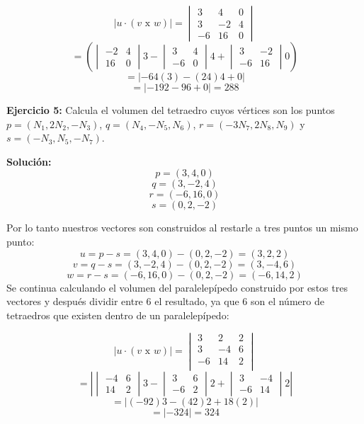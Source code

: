 \documentclass{article}
\begin{document}
$$\left| u \cdot(v\text{ x }w)\right| = \begin{vmatrix}
    3 & 4 & 0 \\
    3 & -2 & 4 \\
    -6 & 16 & 0
\end{vmatrix}$$
$$ = \left(\begin{vmatrix}
    -2 & 4 \\
    16 & 0 
\end{vmatrix}3-\begin{vmatrix}
    3 & 4 \\
    -6 & 0
\end{vmatrix}4+ \begin{vmatrix}
    3 & -2 \\
    -6 & 16
\end{vmatrix}0\right)$$
$$=\left|-64(3)-(24)4+0\right|$$
$$=\left|-192-96+0\right| = 288$$

\textbf{Ejercicio 5:} Calcula el volumen del tetraedro cuyos vértices son los puntos $p = (N_1, 2N_2 , -N_3)$, $q =(N_4,-N_5,N_6)$, 
$r = (-3N_7, 2N_8,N_9)$ y $s =(-N_3, N_5,-N_7)$. 
\vspace{10pt}

\textbf{Solución:}
$$p =(3, 4, 0)$$
$$q =(3,-2,4)$$
$$r = (-6, 16,0)$$
$$s =(0, 2,-2)$$ 

Por lo tanto nuestros vectores son construidos al restarle a tres puntos un mismo punto:
$$u = p -s = (3, 4, 0) - (0, 2,-2) = (3, 2, 2)$$
$$v = q - s= (3,-2,4)-(0, 2,-2) = (3, -4, 6)$$
$$w = r - s = (-6, 16, 0) - (0, 2,-2)= (-6, 14, 2)$$
Se continua calculando el volumen del paralelepípedo construido por estos tres vectores y después dividir entre 6 el resultado, ya que 6 son 
el número de tetraedros que existen dentro de un paralelepípedo:

$$\left| u \cdot(v\text{ x }w)\right| = \begin{vmatrix}
    3 & 2 & 2 \\
    3 & -4 & 6 \\
    -6 & 14 & 2 \\
\end{vmatrix}$$
$$ = \left|\begin{vmatrix}
    -4 & 6 \\
    14 & 2 
\end{vmatrix}3-\begin{vmatrix}
    3 & 6 \\
    -6 & 2 
\end{vmatrix}2+\begin{vmatrix}
    3 & -4 \\
    -6 & 14
\end{vmatrix}2\right|$$
$$ = \left| (-92)3 -(42)2+ 18(2)\right| $$
$$ = \left| -324\right| = 324$$
\end{document}
